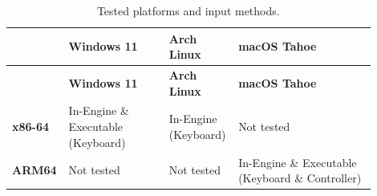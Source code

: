 \documentclass[../Main.tex]{subfiles}
\begin{document}
{\small
\begin{longtable}{>{\raggedright\arraybackslash}p{0.1\linewidth}>{\raggedright\arraybackslash}p{0.27\linewidth}>{\raggedright\arraybackslash}p{0.16\linewidth}>{\raggedright\arraybackslash}p{0.37\linewidth}}
\caption{Tested platforms and input methods.}\label{tab:platforms} \\
\hline
 & \textbf{Windows 11} & \textbf{Arch Linux} & \textbf{macOS Tahoe} \\
\hline
\endfirsthead
\hline
 & \textbf{Windows 11} & \textbf{Arch Linux} & \textbf{macOS Tahoe} \\
\hline
\endhead
\hline
\endlastfoot
\textbf{x86-64} & In-Engine \& Executable (Keyboard) & In-Engine (Keyboard) & Not tested \\
\textbf{ARM64} & Not tested & Not tested & In-Engine \& Executable (Keyboard \& Controller) \\
\end{longtable}
}

\newpage
\end{document}
